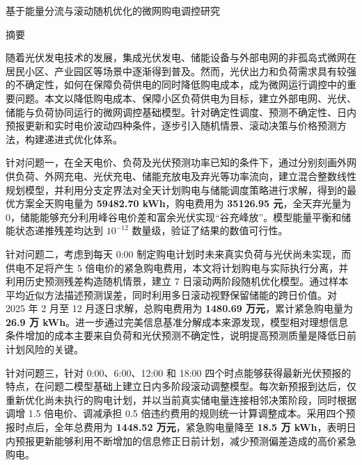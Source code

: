 \begin{center}{\heiti 基于能量分流与滚动随机优化的微网购电调控研究}\end{center}

\vspace{0.5em}
\begin{center}{\heiti 摘\quad 要}\end{center}
\vspace{0.3em}
\begingroup{}\linespread{1.22}\selectfont

随着光伏发电技术的发展，集成光伏发电、储能设备与外部电网的非孤岛式微网在居民小区、产业园区等场景中逐渐得到普及。然而，光伏出力和负荷需求具有较强的不确定性，如何在保障负荷供电的同时降低购电成本，成为微网运行调控中的重要问题。本文以降低购电成本、保障小区负荷供电为目标，建立外部电网、光伏、储能与负荷协同运行的微网调控基础模型。针对确定性调度、预测不确定性、日内预报更新和实时电价波动四种条件，逐步引入随机情景、滚动决策与价格预测方法，构建递进式优化体系。

针对问题一，在全天电价、负荷及光伏预测功率已知的条件下，通过分别刻画外网供负荷、外网充电、光伏充电、储能充放电及弃光等功率流向，建立混合整数线性规划模型，并利用分支定界法对全天计划购电与储能调度策略进行求解，得到的最优方案全天购电量为 \textbf{59482.70 kWh}，购电费用为\textbf{ 35126.95 元}，全天弃光量为 0，储能能够充分利用峰谷电价差和富余光伏实现“谷充峰放”。模型能量平衡和储能状态递推残差均达到 \(10^{-12}\) 数量级，验证了结果的数值可行性。

针对问题二，考虑到每天 0:00 制定购电计划时未来真实负荷与光伏尚未实现，而供电不足将产生 5 倍电价的紧急购电费用，本文将计划购电与实际执行分离，并利用历史预测残差构造随机情景，建立 7 日滚动两阶段随机优化模型。通过样本平均近似方法描述预测误差，同时利用多日滚动视野保留储能的跨日价值。对 2025 年 2 月至 12 月逐日求解，总购电费用为 \textbf{1480.69 万元}，累计紧急购电量为 \textbf{26.9 万 kWh}。进一步通过完美信息基准分解成本来源发现，模型相对理想信息条件增加的成本主要来自负荷和光伏预测不确定性，说明提高预测质量是降低日前计划风险的关键。

针对问题三，针对 0:00、6:00、12:00 和 18:00 四个时点能够获得最新光伏预报的特点，在问题二模型基础上建立日内多阶段滚动调整模型。每次新预报到达后，仅重新优化尚未执行的购电计划，并以当前真实储电量连接相邻决策阶段，同时根据调增 1.5 倍电价、调减承担 0.5 倍违约费用的规则统一计算调整成本。采用四个预报时点后，全年总费用为 \textbf{1448.52 万元}，紧急购电量降至 \textbf{18.5 万 kWh}，表明日内预报更新能够利用不断增加的信息修正日前计划，减少预测偏差造成的高价紧急购电。

